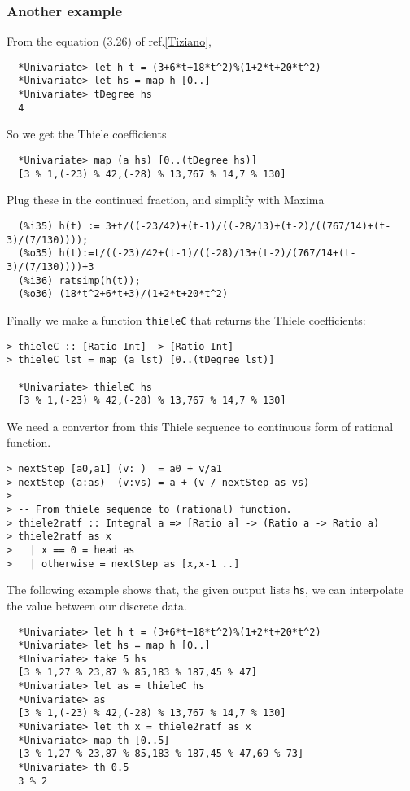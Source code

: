 \documentclass[11pt]{book}
\begin{document}
\subsubsection{Another example}
From the equation (3.26) of ref.\ref{Tiziano},
\begin{verbatim}
  *Univariate> let h t = (3+6*t+18*t^2)%(1+2*t+20*t^2)
  *Univariate> let hs = map h [0..]
  *Univariate> tDegree hs
  4
\end{verbatim}
So we get the Thiele coefficients
\begin{verbatim}  
  *Univariate> map (a hs) [0..(tDegree hs)]
  [3 % 1,(-23) % 42,(-28) % 13,767 % 14,7 % 130]
\end{verbatim}
Plug these in the continued fraction, and simplify with Maxima
\begin{verbatim}
  (%i35) h(t) := 3+t/((-23/42)+(t-1)/((-28/13)+(t-2)/((767/14)+(t-3)/(7/130))));
  (%o35) h(t):=t/((-23)/42+(t-1)/((-28)/13+(t-2)/(767/14+(t-3)/(7/130))))+3
  (%i36) ratsimp(h(t));
  (%o36) (18*t^2+6*t+3)/(1+2*t+20*t^2)
\end{verbatim}
Finally we make a function \verb+thieleC+ that returns the Thiele coefficients:
\begin{verbatim}
> thieleC :: [Ratio Int] -> [Ratio Int]
> thieleC lst = map (a lst) [0..(tDegree lst)]

  *Univariate> thieleC hs
  [3 % 1,(-23) % 42,(-28) % 13,767 % 14,7 % 130]
\end{verbatim}

We need a convertor from this Thiele sequence to continuous form of rational function.
\begin{verbatim}
> nextStep [a0,a1] (v:_)  = a0 + v/a1
> nextStep (a:as)  (v:vs) = a + (v / nextStep as vs)
>
> -- From thiele sequence to (rational) function.
> thiele2ratf :: Integral a => [Ratio a] -> (Ratio a -> Ratio a)
> thiele2ratf as x
>   | x == 0 = head as
>   | otherwise = nextStep as [x,x-1 ..]
\end{verbatim}
The following example shows that, the given output lists \verb+hs+, we can interpolate the value between our discrete data.
\begin{verbatim}
  *Univariate> let h t = (3+6*t+18*t^2)%(1+2*t+20*t^2)
  *Univariate> let hs = map h [0..]
  *Univariate> take 5 hs
  [3 % 1,27 % 23,87 % 85,183 % 187,45 % 47]
  *Univariate> let as = thieleC hs
  *Univariate> as
  [3 % 1,(-23) % 42,(-28) % 13,767 % 14,7 % 130]
  *Univariate> let th x = thiele2ratf as x
  *Univariate> map th [0..5]
  [3 % 1,27 % 23,87 % 85,183 % 187,45 % 47,69 % 73]
  *Univariate> th 0.5
  3 % 2
\end{verbatim}
\end{document}
